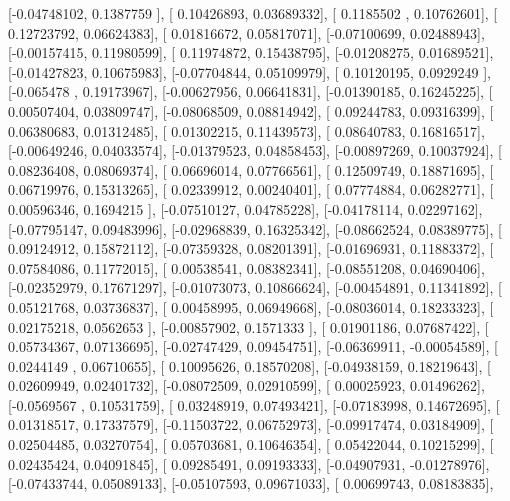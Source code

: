 \documentclass{article}
\begin{document}
       [-0.04748102,  0.1387759 ],
       [ 0.10426893,  0.03689332],
       [ 0.1185502 ,  0.10762601],
       [ 0.12723792,  0.06624383],
       [ 0.01816672,  0.05817071],
       [-0.07100699,  0.02488943],
       [-0.00157415,  0.11980599],
       [ 0.11974872,  0.15438795],
       [-0.01208275,  0.01689521],
       [-0.01427823,  0.10675983],
       [-0.07704844,  0.05109979],
       [ 0.10120195,  0.0929249 ],
       [-0.065478  ,  0.19173967],
       [-0.00627956,  0.06641831],
       [-0.01390185,  0.16245225],
       [ 0.00507404,  0.03809747],
       [-0.08068509,  0.08814942],
       [ 0.09244783,  0.09316399],
       [ 0.06380683,  0.01312485],
       [ 0.01302215,  0.11439573],
       [ 0.08640783,  0.16816517],
       [-0.00649246,  0.04033574],
       [-0.01379523,  0.04858453],
       [-0.00897269,  0.10037924],
       [ 0.08236408,  0.08069374],
       [ 0.06696014,  0.07766561],
       [ 0.12509749,  0.18871695],
       [ 0.06719976,  0.15313265],
       [ 0.02339912,  0.00240401],
       [ 0.07774884,  0.06282771],
       [ 0.00596346,  0.1694215 ],
       [-0.07510127,  0.04785228],
       [-0.04178114,  0.02297162],
       [-0.07795147,  0.09483996],
       [-0.02968839,  0.16325342],
       [-0.08662524,  0.08389775],
       [ 0.09124912,  0.15872112],
       [-0.07359328,  0.08201391],
       [-0.01696931,  0.11883372],
       [ 0.07584086,  0.11772015],
       [ 0.00538541,  0.08382341],
       [-0.08551208,  0.04690406],
       [-0.02352979,  0.17671297],
       [-0.01073073,  0.10866624],
       [-0.00454891,  0.11341892],
       [ 0.05121768,  0.03736837],
       [ 0.00458995,  0.06949668],
       [-0.08036014,  0.18233323],
       [ 0.02175218,  0.0562653 ],
       [-0.00857902,  0.1571333 ],
       [ 0.01901186,  0.07687422],
       [ 0.05734367,  0.07136695],
       [-0.02747429,  0.09454751],
       [-0.06369911, -0.00054589],
       [ 0.0244149 ,  0.06710655],
       [ 0.10095626,  0.18570208],
       [-0.04938159,  0.18219643],
       [ 0.02609949,  0.02401732],
       [-0.08072509,  0.02910599],
       [ 0.00025923,  0.01496262],
       [-0.0569567 ,  0.10531759],
       [ 0.03248919,  0.07493421],
       [-0.07183998,  0.14672695],
       [ 0.01318517,  0.17337579],
       [-0.11503722,  0.06752973],
       [-0.09917474,  0.03184909],
       [ 0.02504485,  0.03270754],
       [ 0.05703681,  0.10646354],
       [ 0.05422044,  0.10215299],
       [ 0.02435424,  0.04091845],
       [ 0.09285491,  0.09193333],
       [-0.04907931, -0.01278976],
       [-0.07433744,  0.05089133],
       [-0.05107593,  0.09671033],
       [ 0.00699743,  0.08183835],
\end{document}
